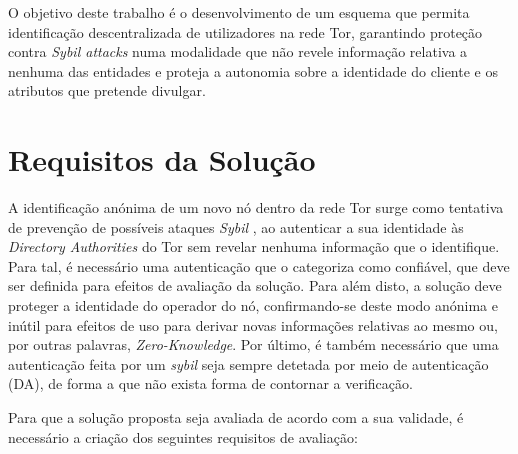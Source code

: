 O objetivo deste trabalho é o desenvolvimento de um esquema que permita identificação descentralizada de utilizadores na rede Tor, garantindo proteção contra \textit{Sybil attacks} \cite{douceur2002sybil} numa modalidade que não revele informação relativa a nenhuma das entidades e proteja a autonomia sobre a identidade do cliente e os atributos que pretende divulgar.

\section*{Requisitos da Solução}
\label{sec:requisitos_solucao}

A identificação anónima de um novo nó dentro da rede Tor surge como tentativa de prevenção de possíveis ataques \textit{Sybil} \cite{douceur2002sybil}, ao autenticar a sua identidade às \textit{Directory Authorities} do Tor sem revelar nenhuma informação que o identifique. Para tal, é necessário uma autenticação que o categoriza como confiável, que deve ser definida para efeitos de avaliação da solução. Para além disto, a solução deve proteger a identidade do operador do nó, confirmando-se deste modo anónima e inútil para efeitos de uso para derivar novas informações relativas ao mesmo ou, por outras palavras, \textit{Zero-Knowledge}. Por último, é também necessário que uma autenticação feita por um \textit{sybil} seja sempre detetada por meio de autenticação (DA), de forma a que não exista forma de contornar a verificação.

Para que a solução proposta seja avaliada de acordo com a sua validade, é necessário a criação dos seguintes requisitos de avaliação:

